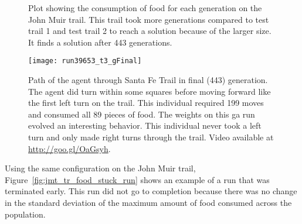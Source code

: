 \begin{figure}[ht]
\centering
{}
\caption[Food Consumed in John Muir Trail]{Plot showing the consumption of food for each generation on the John Muir trail. This trail took more generations compared to test trail 1 and test trail 2 to reach a solution because of the larger size. It finds a solution after 443 generations.}
\label{fig:jmt_tr_food_consumed}
\end{figure}

\begin{figure}[ht]
\centering
\texttt{[image: run39653\_t3\_gFinal]}
\caption[Individual Path in John Muir Trail]{Path of the agent through Santa Fe Trail in final (443) generation. The agent did turn within some squares before moving forward like the first left turn on the trail. This individual required 199 moves and consumed all 89 pieces of food. The weights on this \gls{ga} run evolved an interesting behavior. This individual never took a left turn and only made right turns through the trail. Video available at \url{http://goo.gl/OaGsyh}.}
\label{fig:jmt_tr_final_gen}
\end{figure}

\clearpage
Using the same configuration on the John Muir trail, Figure~\ref{fig:jmt_tr_food_stuck_run} shows an example of a run that was terminated early. This run did not go to completion because there was no change in the standard deviation of the maximum amount of food consumed across the population.

